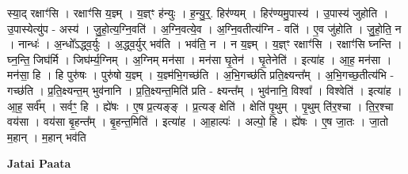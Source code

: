 \documentclass[17pt]{extarticle}
\begin{document}
स्या॒द् रक्षाꣳ॑सि । रक्षाꣳ॑सि य॒ज्ञ्म् । य॒ज्ञ्ꣳ ह॑न्युः । ह॒न्यु॒र्॒. हिर॑ण्यम् । हिर॑ण्यमु॒पास्य॑ । उ॒पास्य॑ जुहोति । उ॒पास्येत्यु॑प - अस्य॑ । जु॒हो॒त्य॒ग्नि॒वति॑ । अ॒ग्नि॒वत्ये॒व । अ॒ग्नि॒वतीत्य॑ग्नि - वति॑ । ए॒व जु॑होति । जु॒हो॒ति॒ न । नान्धः॑ । अ॒न्धो᳚ऽद्ध्व॒र्युः । अ॒द्ध्व॒र्युर् भव॑ति । भव॑ति॒ न । न य॒ज्ञ्म् । य॒ज्ञ्ꣳ रक्षाꣳ॑सि । रक्षाꣳ॑सि घ्नन्ति । घ्न॒न्ति॒ जिघ॑र्मि । जिघ॑र्म्य॒ग्निम् । अ॒ग्निम् मन॑सा । मन॑सा घृ॒तेन॑ । घृ॒तेनेति॑ । इत्या॑ह । आ॒ह॒ मन॑सा । मन॑सा॒ हि । हि पुरु॑षः । पुरु॑षो य॒ज्ञ्म् । य॒ज्ञ्म॑भि॒गच्छ॑ति । अ॒भि॒गच्छ॑ति प्रति॒क्ष्यन्त᳚म् । अ॒भि॒गच्छ॒तीत्य॑भि - गच्छ॑ति । प्र॒ति॒क्ष्यन्त॒म् भुव॑नानि । प्र॒ति॒क्ष्यन्त॒मिति॑ प्रति - क्ष्यन्त᳚म् । भुव॑नानि॒ विश्वा᳚ । विश्वेति॑ । इत्या॑ह । आ॒ह॒ सर्व᳚म् । सर्वꣳ॒॒ हि । ह्ये॑षः । ए॒ष प्र॒त्यङ्ङ् । प्र॒त्यङ् क्षेति॑ । क्षेति॑ पृ॒थुम् । पृ॒थुम् ति॑र॒श्चा । ति॒र॒श्चा वय॑सा । वय॑सा बृ॒हन्त᳚म् । बृ॒हन्त॒मिति॑ । इत्या॑ह । आ॒हाल्पः॑ । अल्पो॒ हि । ह्ये॑षः । ए॒ष जा॒तः । जा॒तो म॒हान् । म॒हान् भव॑ति \newline

\textbf{Jatai Paata} \newline
\end{document}
